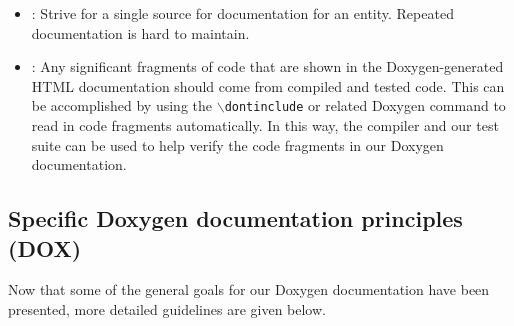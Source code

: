 \begin{itemize}
\item\DOXPDoNotRepeat: Strive for a single source for documentation
  for an entity.  Repeated documentation is hard to maintain.

\item\DOXPDocumentationMaintainItself: Any significant fragments of
  code that are shown in the Doxygen-generated HTML documentation
  should come from compiled and tested code.  This can be accomplished
  by using the \texttt{$\backslash$dontinclude} or related Doxygen
  command to read in code fragments automatically.  In this way, the
  compiler and our test suite can be used to help verify the code
  fragments in our Doxygen documentation.

\end{itemize}


%
\subsection{Specific Doxygen documentation principles (DOX)}
%

Now that some of the general goals for our Doxygen documentation have
been presented, more detailed guidelines are given below.


